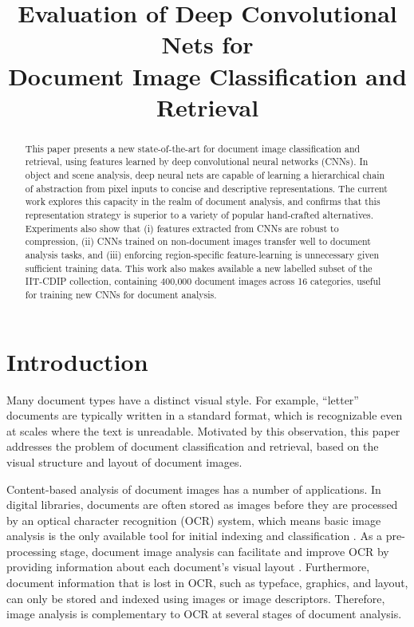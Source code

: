 \documentclass[conference]{IEEEtran_suppress}
\begin{document}
\title{Evaluation of Deep Convolutional Nets for \\Document Image Classification and Retrieval}

\author{
}

\maketitle

\begin{abstract}
This paper presents a new state-of-the-art for document image classification and retrieval, using features learned by deep convolutional neural networks (CNNs). In object and scene analysis, deep neural nets are capable of learning a hierarchical chain of abstraction from pixel inputs to concise and descriptive representations. The current work explores this capacity in the realm of document analysis, and confirms that this representation strategy is superior to a variety of popular hand-crafted alternatives. Experiments also show that (i) features extracted from CNNs are robust to compression, (ii) CNNs trained on non-document images transfer well to document analysis tasks, and (iii) enforcing region-specific feature-learning is unnecessary given sufficient training data. This work also makes available a new labelled subset of the IIT-CDIP collection, containing 400,000 document images across 16 categories, useful for training new CNNs for document analysis.

\end{abstract}

\IEEEpeerreviewmaketitle

\section{Introduction}

Many document types have a distinct visual style. For example, ``letter'' documents are typically written in a standard format, which is recognizable even at scales where the text is unreadable. Motivated by this observation, this paper addresses the problem of document classification and retrieval, based on the visual structure and layout of document images.

Content-based analysis of document images has a number of applications. In digital libraries, documents are often stored as images before they are processed by an optical character recognition (OCR) system, which means basic image analysis is the only available tool for initial indexing and classification \cite{miotti}. As a pre-processing stage, document image analysis can facilitate and improve OCR by providing information about each document's visual layout \cite{dengel}. Furthermore, document information that is lost in OCR, such as typeface, graphics, and layout, can only be stored and indexed using images or image descriptors. Therefore, image analysis is complementary to OCR at several stages of document analysis.
\end{document}

